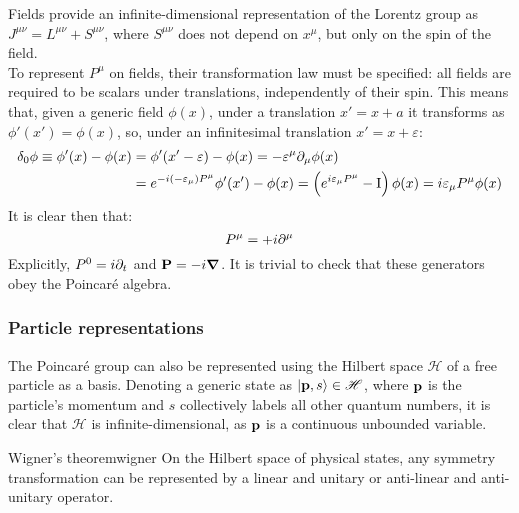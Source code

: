 Fields provide an infinite-dimensional representation of the Lorentz group as $ J^{\mu \nu} = L^{\mu \nu} + S^{\mu \nu} $, where $ S^{\mu \nu} $ does not depend on $ x^\mu $, but only on the spin of the field.\\
To represent $ P^\mu $ on fields, their transformation law must be specified: all fields are required to be scalars under translations, independently of their spin. This means that, given a generic field $ \phi(x) $, under a translation $ x' = x + a $ it transforms as $ \phi'(x') = \phi(x) $, so, under an infinitesimal translation $ x' = x + \varepsilon $:
\begin{equation*}
  \begin{split}
    \delta_0 \phi \equiv \phi'(x) - \phi(x) &= \phi'(x' - \varepsilon) - \phi(x) = - \varepsilon^\mu \partial_\mu \phi(x) \\
                                            &= e^{-i (-\varepsilon_\mu) P^\mu} \phi'(x') - \phi(x) = \left( e^{i \varepsilon_\mu P^\mu} - \mathrm{I} \right) \phi(x) = i \varepsilon_\mu P^\mu \phi(x)
  \end{split}
\end{equation*}
It is clear then that:
\begin{equation}
  P^\mu = +i \partial^\mu
  \label{eq:1.55}
\end{equation}
Explicitly, $ P^0 = i \partial_t $ and $ \mathbf{P} = - i \boldsymbol{\nabla} $. It is trivial to check that these generators obey the Poincaré algebra.

\subsubsection{Particle representations}

The Poincaré group can also be represented using the Hilbert space $ \mathscr{H} $ of a free particle as a basis. Denoting a generic state as $ \ket{\mathbf{p},s} \in \mathscr{H} $, where $ \mathbf{p} $ is the particle's momentum and $ s $ collectively labels all other quantum numbers, it is clear that $ \mathscr{H} $ is infinite-dimensional, as $ \mathbf{p} $ is a continuous unbounded variable.

\begin{theorem}{Wigner's theorem}{wigner}
  On the Hilbert space of physical states, any symmetry transformation can be represented by a linear and unitary or anti-linear and anti-unitary operator.
\end{theorem}


